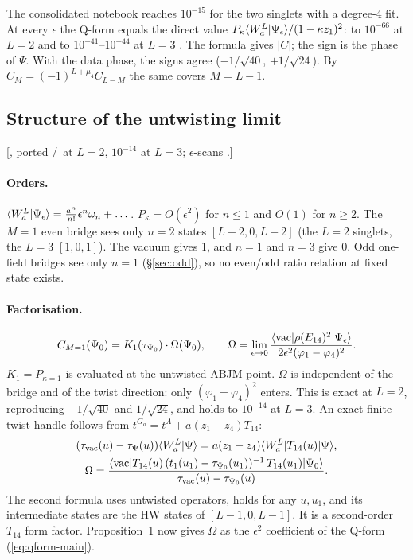 The consolidated notebook  reaches $10^{-15}$ for the two singlets with a degree-4 fit.
At every $\epsilon$ the Q-form equals the direct value $P_\kappa\langle W_a^L|\Psi_\epsilon\rangle/(1-\kappa z_1)^2$: to $10^{-66}$ at
$L=2$ and to $10^{-41}$--$10^{-44}$ at $L=3$ \hp. The formula gives $|C|$; the sign is the phase of $\Psi$. With the data
phase, the signs agree ($-1/\sqrt{40}$, $+1/\sqrt{24}$). By $C_M=(-1)^{L+\mu_4}C_{L-M}$ the same covers $M=L-1$.

\subsection{Structure of the untwisting limit}\label{sec:qform-limit}

[, ported \ex/\hp\ at $L=2$, $10^{-14}$ at $L=3$; $\epsilon$-scans \npy.]

\paragraph{Orders.} $\langle W_a^L|\Psi_\epsilon\rangle=\frac{a^n}{n!}\epsilon^n\omega_n+\dots$. $P_\kappa=O(\epsilon^2)$ for $n\le1$ and
$O(1)$ for $n\ge2$. The $M=1$ even bridge sees only $n=2$ states $[L-2,0,L-2]$ (the $L=2$ singlets, the $L=3$ $[1,0,1]$). The
vacuum gives 1, and $n=1$ and $n=3$ give 0. Odd one-field bridges see only $n=1$ (\S\ref{sec:odd}), so no even/odd ratio
relation at fixed state exists.

\paragraph{Factorisation.}
\begin{equation}
 C_{M=1}(\Psi_0)=K_1(\tau_{\Psi_0})\cdot\Omega(\Psi_0),\qquad
 \Omega=\lim_{\epsilon\to0}\frac{\langle\mathrm{vac}|\rho(E_{14})^2|\Psi_\epsilon\rangle}{2\epsilon^2(\varphi_1-\varphi_4)^2}.
\end{equation}
$K_1=P_{\kappa=1}$ is evaluated at the untwisted ABJM point. $\Omega$ is independent of the bridge and of the twist direction:
only $(\varphi_1-\varphi_4)^2$ enters. This is exact at $L=2$, reproducing $-1/\sqrt{40}$ and $1/\sqrt{24}$, and holds to
$10^{-14}$ at $L=3$. An exact finite-twist handle follows from $t^{G_a}=t^\Lambda+a(z_1-z_4)T_{14}$:
\begin{gather}
 (\tau_{\mathrm{vac}}(u)-\tau_\Psi(u))\langle W_a^L|\Psi\rangle=a(z_1-z_4)\langle W_a^L|T_{14}(u)|\Psi\rangle,\\
 \Omega=\frac{\langle\mathrm{vac}| T_{14}(u)\,(t_1(u_1)-\tau_{\Psi_0}(u_1))^{-1}\,T_{14}(u_1)|\Psi_0\rangle}{\tau_{\mathrm{vac}}(u)-\tau_{\Psi_0}(u)} .
\end{gather}
The second formula uses untwisted operators, holds for any $u,u_1$, and its intermediate states are the HW states of
$[L-1,0,L-1]$. It is a second-order $T_{14}$ form factor. Proposition~1 now gives $\Omega$ as the $\epsilon^2$ coefficient of
the Q-form (\ref{eq:qform-main}).

